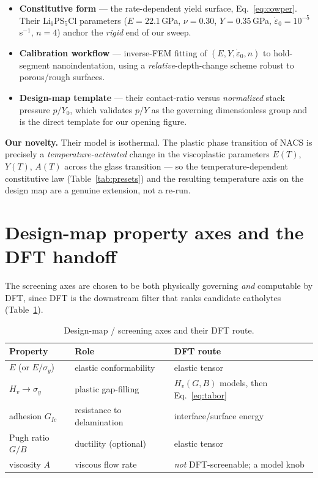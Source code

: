 \documentclass[11pt]{article}
\begin{document}
\begin{itemize}
  \item \textbf{Constitutive form} --- the rate-dependent yield surface,
  Eq.~\ref{eq:cowper}. Their Li$_6$PS$_5$Cl parameters
  ($E=22.1$\,GPa, $\nu=0.30$, $Y=0.35$\,GPa, $\dot{\varepsilon}_0=10^{-5}$\,s$^{-1}$,
  $n=4$) anchor the \emph{rigid} end of our sweep.
  \item \textbf{Calibration workflow} --- inverse-FEM fitting of $(E,Y,\dot{\varepsilon}_0,n)$
  to hold-segment nanoindentation, using a \emph{relative}-depth-change scheme
  robust to porous/rough surfaces.
  \item \textbf{Design-map template} --- their contact-ratio versus
  \emph{normalized} stack pressure $p/Y_0$, which validates $p/Y$ as the
  governing dimensionless group and is the direct template for our opening
  figure.
\end{itemize}

\noindent\textbf{Our novelty.} Their model is isothermal. The plastic phase
transition of NACS is precisely a \emph{temperature-activated} change in the
viscoplastic parameters $E(T)$, $Y(T)$, $A(T)$ across the glass transition ---
so the temperature-dependent constitutive law (Table~\ref{tab:presets}) and the
resulting temperature axis on the design map are a genuine extension, not a
re-run.

\section{Design-map property axes and the DFT handoff}

The screening axes are chosen to be both physically governing \emph{and}
computable by DFT, since DFT is the downstream filter that ranks candidate
catholytes (Table~\ref{tab:axes}).

\begin{table}[h]
\centering
\caption{Design-map / screening axes and their DFT route.}
\label{tab:axes}
\begin{tabular}{lll}
\toprule
Property & Role & DFT route \\
\midrule
$E$ (or $E/\sigma_y$) & elastic conformability & elastic tensor \\
$H_v \to \sigma_y$ & plastic gap-filling & $H_v(G,B)$ models, then Eq.~\ref{eq:tabor} \\
adhesion $G_{Ic}$ & resistance to delamination & interface/surface energy \\
Pugh ratio $G/B$ & ductility (optional) & elastic tensor \\
viscosity $A$ & viscous flow rate & \emph{not} DFT-screenable; a model knob \\
\bottomrule
\end{tabular}
\end{table}
\end{document}
